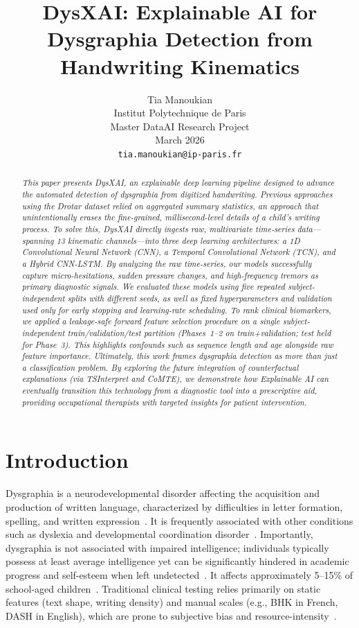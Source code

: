 \documentclass{article}
\title{DysXAI: Explainable AI for Dysgraphia Detection from Handwriting Kinematics}
\author{%
  Tia Manoukian \\
  Institut Polytechnique de Paris \\
  Master DataAI Research Project \\
  March 2026 \\
  \texttt{tia.manoukian@ip-paris.fr} \\
}
\begin{document}
\maketitle

\begin{abstract}
\textit{This paper presents DysXAI, an explainable deep learning pipeline designed to advance the automated detection of dysgraphia from digitized handwriting. Previous approaches using the Drotar dataset relied on aggregated summary statistics, an approach that unintentionally erases the fine-grained, millisecond-level details of a child's writing process. To solve this, DysXAI directly ingests raw, multivariate time-series data—spanning 13 kinematic channels—into three deep learning architectures: a 1D Convolutional Neural Network (CNN), a Temporal Convolutional Network (TCN), and a Hybrid CNN-LSTM. By analyzing the raw time-series, our models successfully capture micro-hesitations, sudden pressure changes, and high-frequency tremors as primary diagnostic signals. We evaluated these models using five repeated subject-independent splits with different seeds, as well as fixed hyperparameters and validation used only for early stopping and learning-rate scheduling. To rank clinical biomarkers, we applied a leakage-safe forward feature selection procedure on a single subject-independent train/validation/test partition (Phases~1--2 on train+validation; test held for Phase~3). This highlights confounds such as sequence length and age alongside raw feature importance. Ultimately, this work frames dysgraphia detection as more than just a classification problem. By exploring the future integration of counterfactual explanations (via TSInterpret and CoMTE), we demonstrate how Explainable AI can eventually transition this technology from a diagnostic tool into a prescriptive aid, providing occupational therapists with targeted insights for patient intervention.}
\end{abstract}


\section{Introduction}
\label{sec:intro}

Dysgraphia is a neurodevelopmental disorder affecting the acquisition and production of written language, characterized by difficulties in letter formation, spelling, and written expression~\cite{drotar2020}. It is frequently associated with other conditions such as dyslexia and developmental coordination disorder~\cite{drotar2020}. Importantly, dysgraphia is not associated with impaired intelligence; individuals typically possess at least average intelligence yet can be significantly hindered in academic progress and self-esteem when left undetected~\cite{kunhoth2022}. It affects approximately 5--15\% of school-aged children~\cite{american2013}. Traditional clinical testing relies primarily on static features (text shape, writing density) and manual scales (e.g., BHK in French, DASH in English), which are prone to subjective bias and resource-intensity~\cite{chung2019, kunhoth2024}.
\end{document}
